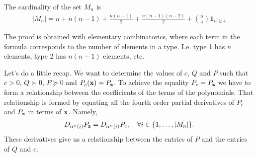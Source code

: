 \documentclass[a4paper,12pt,twoside,BCOR=10mm]{scrbook}
\begin{document}
\begin{theorem}\label{ThmCardinalityOfMn}
The cardinality of the set $M_n$ is
\begin{align*}
    |M_n| = n + n(n - 1) + \frac{n(n - 1)}{2} + \frac{n(n - 1)(n - 2)}{2} + \binom{n}{4}\mathbf{1}_{n\geq 4}
\end{align*}
\end{theorem}
\fi
The proof is obtained with elementary combinatorics, where each term in the formula corresponds to the number of elements in a type. I.e. type 1 has $n$ elements, type 2 has $n(n - 1)$ elements, etc.

Let's do a little recap. We want to determine the values of $c$, $Q$ and $P$ such that $c > 0$, $Q \succ 0$, $P \succeq 0$ and $P_c(\mathbf{x}) = P_{\mathbf{z}}$. To achieve the equality $P_c = P_{\mathbf{z}}$ we have to form a relationship between the coefficients of the terms of the polynomials. That relationship is formed by equating all the fourth order partial derivatives of $P_c$ and $P_{\mathbf{z}}$ in terms of $\mathbf{x}$. Namely,
\begin{align}\label{RelationsGeneralCase}
    D_{\alpha^n(i)} P_{\mathbf{z}} = D_{\alpha^n(i)} P_c, \quad \forall i\in\{1,\ldots,  |M_n|\}.
\end{align}
These derivatives give us a relationship between the entries of $P$ and the entries of $Q$ and $c$.
\end{document}
